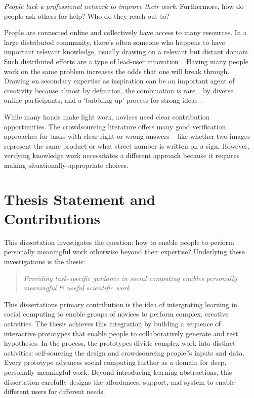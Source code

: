 

\textit{People lack a professional network to improve their work}. 
Furthermore,  how do people ask others for help? Who do they reach out to?

People are connected online and collectively have access to many resources.
In a large distributed community, there’s often someone who happens to 
have important relevant knowledge, usually drawing on a relevant but 
distant domain. Such distributed efforts are a type of lead-user innovation~\cite{VonHippel2005a}. 
Having many people work on the same problem increases the odds that 
one will break through. Drawing on secondary expertise as inspiration can
 be an important agent of creativity because almost by definition, the 
combination is rare~\cite{Boden2004}. %
by diverse online participants, and a ‘bubbling up’ process for strong ideas~\cite{Yu2012}.

While many hands make light work, novices need clear contribution opportunities. 
The crowdsourcing literature offers many good verification approaches for tasks 
with clear right or wrong answers – like whether two images represent the same 
product or what street number is written on a sign. However, verifying knowledge
 work necessitates a different approach because it requires making 
situationally-appropriate choices. 

\section{Thesis Statement and Contributions}
\noindent This dissertation investigates the question: how to enable people to perform personally meaningful work otherwise beyond their expertise? Underlying these investigations is the thesis:
\begin{quote}
\emph{Providing task-specific guidance in social computing enables personally meaningful \& useful scientific work}
\end{quote}

This dissertation\textquotesingle s primary contribution is the idea of intergrating learning in social computing to enable groups of novices to perform complex, creative activities. The thesis achieves this integration by building a sequence of interactive prototypes that enable people to collaboratively generate and test hypotheses. In the process, the prototypes divide complex work into distinct activities: self-sourcing the design and crowdsourcing people''s inputs and data. Every prototype advances social computing further as a domain for deep, personally meaningful work. Beyond introducing learning abstractions, this dissertation carefully designs the affordances, support, and system to enable different users for different needs. 

